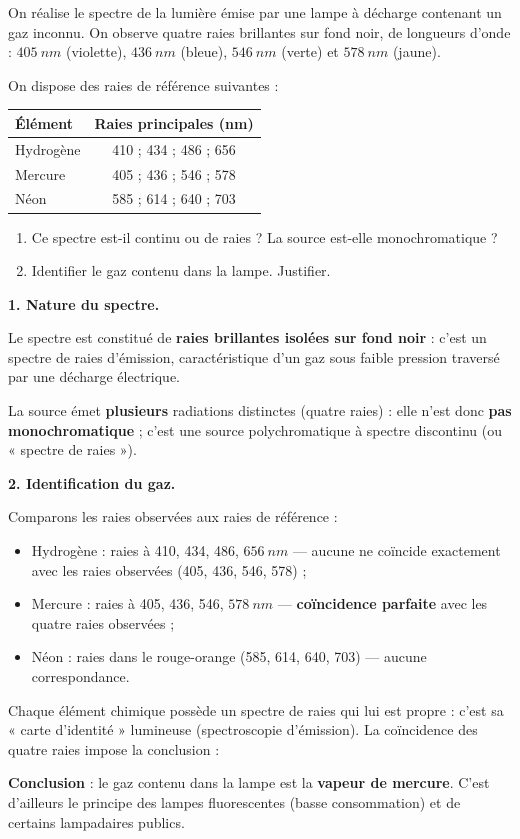 \documentclass[11pt]{article}
\newcommand{\cle}[1]{{\popxbold\color{popdark}#1}}
\begin{document}
\begin{exoresolu}
On réalise le spectre de la lumière émise par une lampe à décharge contenant un gaz inconnu. On observe quatre raies brillantes sur fond noir, de longueurs d'onde : $\SI{405}{nm}$ (violette), $\SI{436}{nm}$ (bleue), $\SI{546}{nm}$ (verte) et $\SI{578}{nm}$ (jaune).

On dispose des raies de référence suivantes :
\begin{center}
\begin{tabular}{|l|c|}
\hline
\rowcolor{popblueL} Élément & Raies principales (nm) \\
\hline
Hydrogène & 410 ; 434 ; 486 ; 656 \\
\hline
Mercure & 405 ; 436 ; 546 ; 578 \\
\hline
Néon & 585 ; 614 ; 640 ; 703 \\
\hline
\end{tabular}
\end{center}
\begin{enumerate}
\item Ce spectre est-il continu ou de raies ? La source est-elle monochromatique ?
\item Identifier le gaz contenu dans la lampe. Justifier.
\end{enumerate}
\tcblower
\textbf{1. Nature du spectre.}

Le spectre est constitué de \textbf{raies brillantes isolées sur fond noir} : c'est un \cle{spectre de raies d'émission}, caractéristique d'un gaz sous faible pression traversé par une décharge électrique.

La source émet \textbf{plusieurs} radiations distinctes (quatre raies) : elle n'est donc \textbf{pas monochromatique} ; c'est une source \cle{polychromatique} à spectre discontinu (ou « spectre de raies »).

\textbf{2. Identification du gaz.}

Comparons les raies observées aux raies de référence :
\begin{itemize}
\item Hydrogène : raies à 410, 434, 486, $\SI{656}{nm}$ — aucune ne coïncide exactement avec les raies observées (405, 436, 546, 578) ;
\item Mercure : raies à 405, 436, 546, $\SI{578}{nm}$ — \textbf{coïncidence parfaite} avec les quatre raies observées ;
\item Néon : raies dans le rouge-orange (585, 614, 640, 703) — aucune correspondance.
\end{itemize}

Chaque élément chimique possède un spectre de raies qui lui est propre : c'est sa « carte d'identité » lumineuse (spectroscopie d'émission). La coïncidence des quatre raies impose la conclusion :

\textbf{Conclusion} : le gaz contenu dans la lampe est la \textbf{vapeur de mercure}. C'est d'ailleurs le principe des lampes fluorescentes (basse consommation) et de certains lampadaires publics.
\end{exoresolu}
\end{document}
